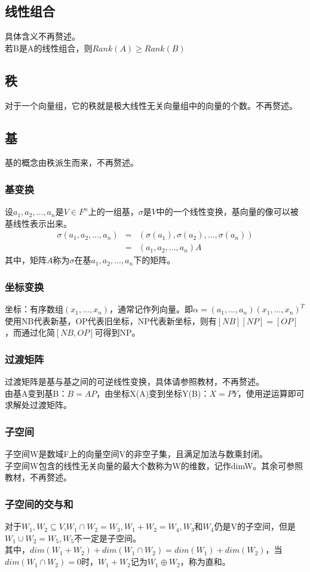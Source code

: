 \documentclass[UTF8]{ctexart}
\begin{document}
\subsection{线性组合}
具体含义不再赘述。\\
\indent
若B是A的线性组合，则$Rank(A)\geq Rank(B)$
\subsection{秩}
对于一个向量组，它的秩就是极大线性无关向量组中的向量的个数。不再赘述。
\subsection{基}
基的概念由秩派生而来，不再赘述。
\subsubsection{基变换}
设$a_1,a_2,...,a_n$是$V \in F^{n}$上的一组基，$\sigma$是$V$中的一个线性变换，基向量的像可以被基线性表示出来。
\begin{eqnarray*}
    \sigma(a_1,a_2,...,a_n) & = & (\sigma(a_1),\sigma(a_2),...,\sigma(a_n))    \\
    & = &(a_1,a_2,...,a_n)A
\end{eqnarray*}
其中，矩阵$A$称为$\sigma$在基$a_1,a_2,...,a_n$下的矩阵。
\subsubsection{坐标变换}
坐标：有序数组$(x_1,...,x_n)$，通常记作列向量。即$\alpha=(a_1,...,a_n)(x_1,...,x_n)^T$\\
\indent
使用NB代表新基，OP代表旧坐标，NP代表新坐标，则有$[NB][NP]=[OP]$，而通过化简$[NB,OP]$可得到NP。
\subsubsection{过渡矩阵}
过渡矩阵是基与基之间的可逆线性变换，具体请参照教材，不再赘述。\\
\indent
由基A变到基B：$B=AP$，由坐标X(A)变到坐标Y(B)：$X=PY$，使用逆运算即可求解处过渡矩阵。
\subsubsection{子空间}
子空间W是数域F上的向量空间V的非空子集，且满足加法与数乘封闭。\\
\indent
子空间W包含的线性无关向量的最大个数称为W的维数，记作dimW。其余可参照教材，不再赘述。
\subsubsection{子空间的交与和}
对于$W_1,W_2\subseteq V$,$W_1\cap W_2=W_3,W_1+W_2=W_4,W_3$和$W_4$仍是V的子空间，但是$W_1\cup W_2=W_5,W_5$不一定是子空间。\\
\indent
其中，$dim(W_1+W_2)+dim(W_1\cap W_2)=dim(W_1)+dim(W_2)$，当$dim(W_1\cap W_2)=0$时，$W_1+W_2$记为$W_1\oplus W_2$，称为直和。\\
\end{document}
